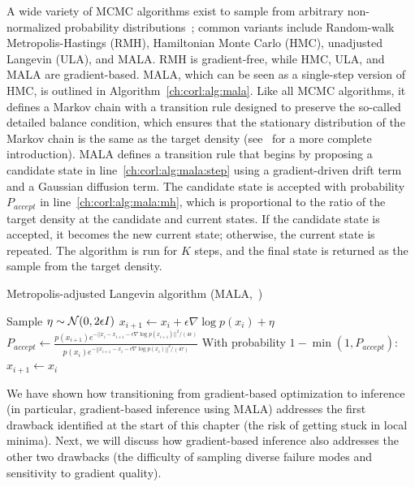 A wide variety of MCMC algorithms exist to sample from arbitrary non-normalized probability distributions~\cite{geyerIntroductionMarkovChain2011}; common variants include Random-walk Metropolis-Hastings (RMH), Hamiltonian Monte Carlo (HMC), unadjusted Langevin (ULA), and MALA. RMH is gradient-free, while HMC, ULA, and MALA are gradient-based. MALA, which can be seen as a single-step version of HMC, is outlined in Algorithm~\ref{ch:corl:alg:mala}. Like all MCMC algorithms, it defines a Markov chain with a transition rule designed to preserve the so-called detailed balance condition, which ensures that the stationary distribution of the Markov chain is the same as the target density (see~\cite{geyerIntroductionMarkovChain2011,aiama} for a more complete introduction). MALA defines a transition rule that begins by proposing a candidate state in line~\ref{ch:corl:alg:mala:step} using a gradient-driven drift term and a Gaussian diffusion term. The candidate state is accepted with probability $P_{accept}$ in line~\ref{ch:corl:alg:mala:mh}, which is proportional to the ratio of the target density at the candidate and current states. If the candidate state is accepted, it becomes the new current state; otherwise, the current state is repeated. The algorithm is run for $K$ steps, and the final state is returned as the sample from the target density.

\begin{algorithm}
    \caption{Metropolis-adjusted Langevin algorithm (MALA,~\cite{maSamplingCanBe2019,robertsLangevinDiffusionsMetropolisHastings2002})\label{ch:corl:alg:mala}}
    \DontPrintSemicolon
    {
    Sample $\eta \sim \mathcal{N}(0, 2\epsilon I)$ \;
    $x_{i+1} \gets x_i + \epsilon \nabla \log p(x_i) + \eta$ \;\label{ch:corl:alg:mala:step}
    $P_{accept} \gets \frac{p(x_{i+1}) e^{-||x_i - x_{i+1} - \epsilon \nabla \log p(x_{i+1})||^2 / (4\epsilon)}}{p(x_{i}) e^{-||x_{i+1} - x_{i} - \epsilon \nabla \log p(x_{i})||^2 / (4\tau)}}$ \;
    With probability $1 - \min(1, P_{accept})$:
    \hspace{2em}$x_{i+1} \gets x_{i}$ \;\label{ch:corl:alg:mala:mh}
    }
\end{algorithm}

We have shown how transitioning from gradient-based optimization to inference (in particular, gradient-based inference using MALA) addresses the first drawback identified at the start of this chapter (the risk of getting stuck in local minima). Next, we will discuss how gradient-based inference also addresses the other two drawbacks (the difficulty of sampling diverse failure modes and sensitivity to gradient quality).


